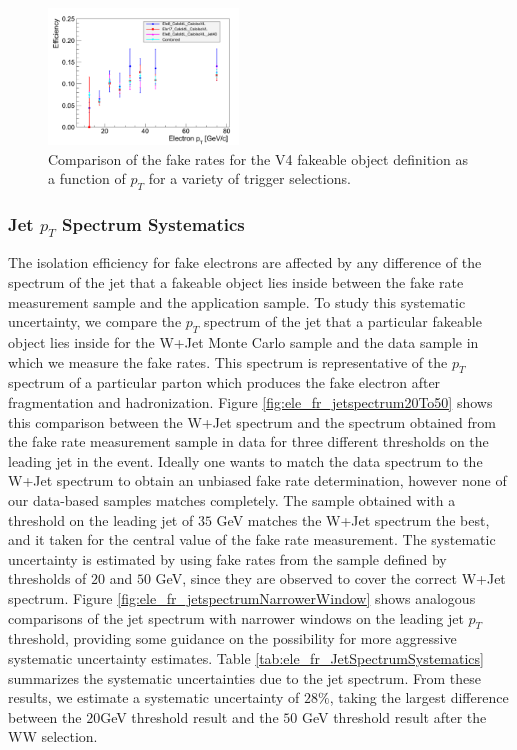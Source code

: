 \begin{figure}[!htbp]
\begin{center}
\includegraphics[width=0.45\textwidth]{figures/ElectronFakeRate_DenominatorV4_TriggerDependence.pdf}
\caption{Comparison of the fake rates for the V4 fakeable object definition as a function of $p_T$
for a variety of trigger selections.}
\label{fig:ele_fr_triggerDependence}
\end{center}
\end{figure}


\subsubsection{Jet $p_{T}$ Spectrum Systematics}
\label{sec:FakeElectronBkgJetSpectrumSystematics}

The isolation efficiency for fake electrons are affected by any difference of the spectrum of the
jet that a fakeable object lies inside between the fake rate measurement sample and the 
application sample. To study this systematic uncertainty, we compare the $p_{T}$ spectrum 
of the jet that a particular fakeable object lies inside for the W+Jet Monte Carlo sample and the
data sample in which we measure the fake rates. This spectrum is representative of the $p_{T}$
spectrum of a particular parton which produces the fake electron after fragmentation and 
hadronization. Figure \ref{fig:ele_fr_jetspectrum20To50} shows this comparison between the W+Jet spectrum and the
spectrum obtained from the fake rate measurement sample in data for three different 
thresholds on the leading jet in the event. Ideally one wants to match the data spectrum to the
W+Jet spectrum to obtain an unbiased fake rate determination, however none of our data-based
samples matches completely. The sample obtained with a threshold on the leading jet of
$35$ GeV matches the W+Jet spectrum the best, and it taken for the central value of the 
fake rate measurement. The systematic uncertainty is estimated by using fake rates from the sample 
defined by thresholds of $20$ and $50$ GeV, since they are observed to cover the 
correct W+Jet spectrum. Figure \ref{fig:ele_fr_jetspectrumNarrowerWindow} shows analogous 
comparisons of the jet spectrum with narrower windows on the leading jet $p_{T}$ threshold,
providing some guidance on the possibility for more aggressive systematic uncertainty 
estimates. Table \ref{tab:ele_fr_JetSpectrumSystematics} summarizes the systematic
uncertainties due to the jet spectrum. From these results, we estimate a systematic uncertainty 
of $28\%$, taking the largest difference between the $20$GeV threshold result and the $50$ GeV 
threshold result after the WW selection.

